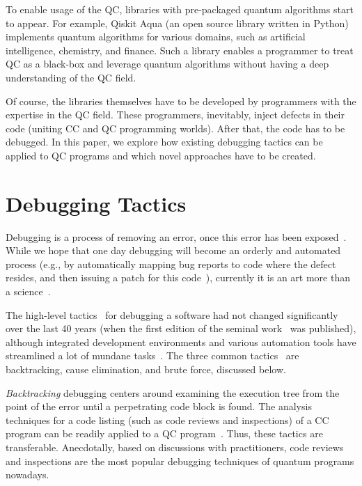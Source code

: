 \documentclass[11pt]{article}
\theoremstyle{plain}
\theoremstyle{definition}
\begin{document}
To enable usage of the QC, libraries with pre-packaged quantum algorithms start to appear. For 
example, Qiskit Aqua \cite{Qiskit} (an open source library written in Python) implements quantum 
algorithms for various domains, such as artificial intelligence, chemistry, and finance. Such a 
library enables a programmer to treat QC as a black-box and leverage quantum algorithms without 
having a deep understanding of the QC field.

Of course, the libraries themselves have to be developed by programmers with the expertise in the 
QC field. These programmers, inevitably, inject defects in their code (uniting CC and QC 
programming worlds). After that, the code has to be debugged. In this paper, we explore how 
existing debugging tactics can be applied to QC programs and which novel approaches have to be 
created.    

\section{Debugging Tactics}\label{sec:traditional}
Debugging is a process of removing an error, once this error has been 
exposed~\cite{pressman2014software}. While we hope that one day debugging will become an orderly 
and automated process (e.g., by automatically mapping bug reports to code where the defect resides, 
and then issuing a patch for this code~\cite{TufanoPWBP19}), currently it is an art more than a 
science~\cite{pressman2014software}. 

The high-level tactics~\cite[Chapter 8]{myers2011art} for debugging a software had not changed 
significantly over the last 40 years (when the first edition of the seminal 
work~\cite{myers2011art} was published), although integrated development environments and various 
automation tools have streamlined a lot of mundane tasks~\cite{zeller09debugging, 
MargineanBCH0MM19}. The three common tactics~\cite{myers2011art,pressman2014software} are 
backtracking, cause elimination, and brute force, discussed below.

\textit{Backtracking} debugging centers around examining the execution tree from the point of the 
error until a perpetrating code block is found. The analysis techniques for a code listing (such as 
code reviews and inspections) of a CC program can be readily applied to a QC 
program~\cite{miranskyy2019testing}. Thus, these tactics are transferable. Anecdotally, based on 
discussions with practitioners, code reviews and inspections are the most popular debugging 
techniques of quantum programs nowadays.
\end{document}
